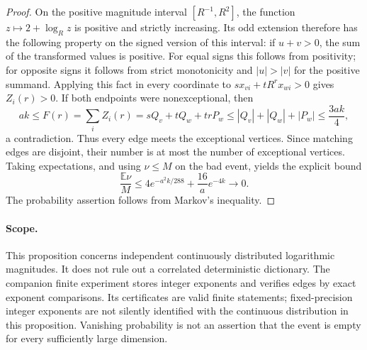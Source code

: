 \documentclass[11pt]{article}
\begin{document}
\begin{proof}
On the positive magnitude interval $[R^{-1},R^2]$, the function
$z\mapsto2+\log_R z$ is positive and strictly increasing.
Its odd extension therefore has the following property on the
signed version of this interval: if $u+v>0$, the sum of the
transformed values is positive. For equal signs this follows
from positivity; for opposite signs it follows from strict
monotonicity and $|u|>|v|$ for the positive summand.
Applying this fact in every coordinate to
$s x_{vi}+tR^r x_{wi}>0$ gives $Z_i(r)>0$.
If both endpoints were nonexceptional, then
\[
 ak\leq F(r)=\sum_i Z_i(r)
 =sQ_v+tQ_w+trP_w
 \leq |Q_v|+|Q_w|+|P_w|
 \leq\frac{3ak}{4},
\]
a contradiction. Thus every edge meets the exceptional vertices.
Since matching edges are disjoint, their number is at most the
number of exceptional vertices. Taking expectations, and using
$\nu\leq M$ on the bad event, yields the explicit bound
\[
 \frac{\mathbb E\nu}{M}
 \leq4e^{-a^2k/288}+\frac{16}{a}e^{-4k}
 \longrightarrow0.
\]
The probability assertion follows from Markov's inequality.
\end{proof}

\paragraph{Scope.}
This proposition concerns independent continuously distributed
logarithmic magnitudes. It does not rule out a correlated deterministic
dictionary. The companion finite experiment stores integer exponents
and verifies edges by exact exponent comparisons. Its certificates
are valid finite statements; fixed-precision integer exponents are
not silently identified with the continuous distribution in this
proposition. Vanishing probability is not an assertion that the
event is empty for every sufficiently large dimension.
\end{document}
